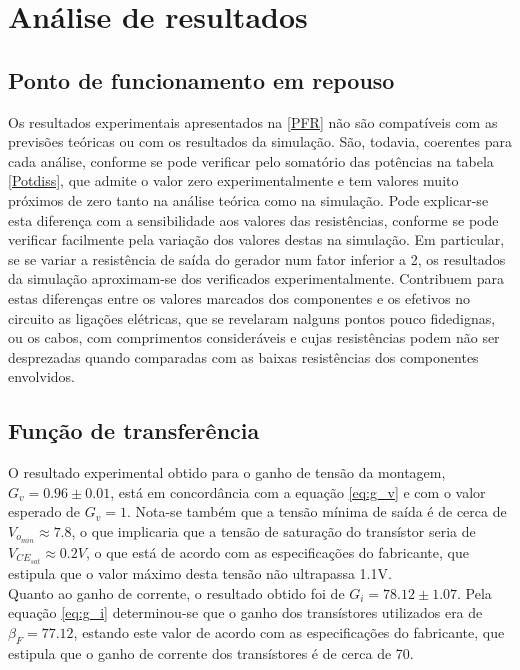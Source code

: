 \documentclass[%
  reprint,
  nofootinbib,
  amsmath,amssymb,
  aps,
  10pt,
  a4paper
]{revtex4-1}
\begin{document}
\section{Análise de resultados}
\label{s:aresul}
\subsection{Ponto de funcionamento em repouso}
Os resultados experimentais apresentados na \ref{PFR} não são compatíveis com as previsões teóricas ou com os resultados da simulação. São, todavia, coerentes para cada análise, conforme se pode verificar pelo somatório das potências na tabela \ref{Potdiss}, que admite o valor zero experimentalmente e tem valores muito próximos de zero tanto na análise teórica como na simulação. Pode explicar-se esta diferença com a sensibilidade aos valores das resistências, conforme se pode verificar facilmente pela variação dos valores destas na simulação. Em particular, se se variar a resistência de saída do gerador num fator inferior a 2, os resultados da simulação aproximam-se dos verificados experimentalmente. Contribuem para estas diferenças entre os valores marcados dos componentes e os efetivos no circuito as ligações elétricas, que se revelaram nalguns pontos pouco fidedignas, ou os cabos, com comprimentos consideráveis e cujas resistências podem não ser desprezadas quando comparadas com as baixas resistências dos componentes envolvidos.

\subsection{Função de transferência}
O resultado experimental obtido para o ganho de tensão da montagem, $G_v=0.96\pm0.01$, está em concordância com a equação \ref{eq:g_v} e com o valor esperado de $G_v=1$. Nota-se também que a tensão mínima de saída é de cerca de $V_{o_{min}}\approx7.8$, o que implicaria que a tensão de saturação do transístor seria de $V_{{CE}_{sat}}\approx0.2V$, o que está de acordo com as especificações do fabricante, que estipula que o valor máximo desta tensão não ultrapassa 1.1V.\\
Quanto ao ganho de corrente, o resultado obtido foi de $G_i=78.12\pm1.07$. Pela equação \ref{eq:g_i} determinou-se que o ganho dos transístores utilizados era de $\beta_F=77.12$, estando este valor de acordo com as especificações do fabricante, que estipula que o ganho de corrente dos transístores é de cerca de 70.
\end{document}

